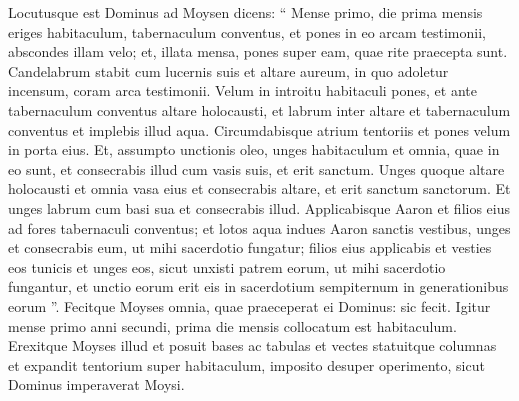 \begin{biblechapter}
\begin{biblechapter}
\begin{biblechapter}
\begin{biblechapter}
\begin{biblechapter}
\begin{biblechapter}
\begin{biblechapter}
\begin{biblechapter}
\begin{biblechapter}
\begin{biblechapter}
\begin{biblechapter}
\begin{biblechapter}
\begin{biblechapter}
\begin{biblechapter}
\begin{biblechapter}
\begin{biblechapter}
\begin{biblechapter}
\begin{biblechapter}
\begin{biblechapter}
\begin{biblechapter}
\begin{biblechapter}
\begin{biblechapter}
\begin{biblechapter}
\begin{biblechapter}
\begin{biblechapter}
\begin{biblechapter}
\begin{biblechapter}
\begin{biblechapter}
\begin{biblechapter}
\begin{biblechapter}
\begin{biblechapter}
\begin{biblechapter}
\begin{biblechapter}
\begin{biblechapter}
\begin{biblechapter}
\begin{biblechapter}
\begin{biblechapter}
\begin{biblechapter}
\begin{biblechapter}
\begin{biblechapter}
\verse Locutusque est Dominus ad Moysen dicens: 
\verse “ Mense primo, die prima mensis eriges habitaculum, tabernaculum conventus, 
\verse et pones in eo arcam testimonii, abscondes illam velo; 
\verse et, illata mensa, pones super eam, quae rite praecepta sunt. Candelabrum stabit cum lucernis suis 
\verse et altare aureum, in quo adoletur incensum, coram arca testimonii. Velum in introitu habitaculi pones, 
\verse et ante tabernaculum conventus altare holocausti, 
\verse et labrum inter altare et tabernaculum conventus et implebis illud aqua. 
\verse Circumdabisque atrium tentoriis et pones velum in porta eius. 
\verse Et, assumpto unctionis oleo, unges habitaculum et omnia, quae in eo sunt, et consecrabis illud cum vasis suis, et erit sanctum. 
\verse Unges quoque altare holocausti et omnia vasa eius et consecrabis altare, et erit sanctum sanctorum. 
\verse Et unges labrum cum basi sua et consecrabis illud. 
\verse Applicabisque Aaron et filios eius ad fores tabernaculi conventus; et lotos aqua 
\verse indues Aaron sanctis vestibus, unges et consecrabis eum, ut mihi sacerdotio fungatur; 
\verse filios eius applicabis et vesties eos tunicis 
\verse et unges eos, sicut unxisti patrem eorum, ut mihi sacerdotio fungantur, et unctio eorum erit eis in sacerdotium sempiternum in generationibus eorum ”. 
 \verse Fecitque Moyses omnia, quae praeceperat ei Dominus: sic fecit.
 \verse Igitur mense primo anni secundi, prima die mensis collocatum est habitaculum. 
\verse Erexitque Moyses illud et posuit bases ac tabulas et vectes statuitque columnas 
\verse et expandit tentorium super habitaculum, imposito desuper operimento, sicut Dominus imperaverat Moysi. 

\end{biblechapter}
\end{biblechapter}
\end{biblechapter}
\end{biblechapter}
\end{biblechapter}
\end{biblechapter}
\end{biblechapter}
\end{biblechapter}
\end{biblechapter}
\end{biblechapter}
\end{biblechapter}
\end{biblechapter}
\end{biblechapter}
\end{biblechapter}
\end{biblechapter}
\end{biblechapter}
\end{biblechapter}
\end{biblechapter}
\end{biblechapter}
\end{biblechapter}
\end{biblechapter}
\end{biblechapter}
\end{biblechapter}
\end{biblechapter}
\end{biblechapter}
\end{biblechapter}
\end{biblechapter}
\end{biblechapter}
\end{biblechapter}
\end{biblechapter}
\end{biblechapter}
\end{biblechapter}
\end{biblechapter}
\end{biblechapter}
\end{biblechapter}
\end{biblechapter}
\end{biblechapter}
\end{biblechapter}
\end{biblechapter}
\end{biblechapter}
